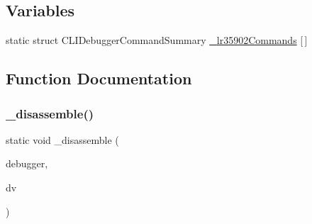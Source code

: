 \subsection*{Variables}
\begin{DoxyCompactItemize}
\item 
static struct C\+L\+I\+Debugger\+Command\+Summary \mbox{\hyperlink{lr35902_2debugger_2cli-debugger_8c_aa99e2662f04c0ce3b3973ab1da121f71}{\+\_\+lr35902\+Commands}} \mbox{[}$\,$\mbox{]}
\end{DoxyCompactItemize}


\subsection{Function Documentation}
\mbox{\label{lr35902_2debugger_2cli-debugger_8c_ab744a20db75c627a6cf552eee9339cc0}} 
\subsubsection{\texorpdfstring{\+\_\+disassemble()}{\_disassemble()}}
{\footnotesize\ttfamily static void \+\_\+disassemble (\begin{DoxyParamCaption}\item[{struct C\+L\+I\+Debugger\+System $\ast$}]{debugger,  }\item[{struct C\+L\+I\+Debug\+Vector $\ast$}]{dv }\end{DoxyParamCaption})\hspace{0.3cm}{\ttfamily [static]}}


